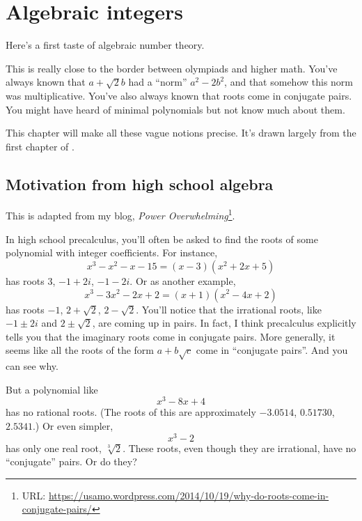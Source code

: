 \chapter{Algebraic integers}
Here's a first taste of algebraic number theory.

This is really close to the border between olympiads and higher math.
You've always known that $a+\sqrt2 b$ had a ``norm'' $a^2-2b^2$,
and that somehow this norm was multiplicative.
You've also always known that roots come in conjugate pairs.
You might have heard of minimal polynomials but not know much about them.

This chapter will make all these vague notions precise.
It's drawn largely from the first chapter of \cite{ref:oggier_NT}.

\section{Motivation from high school algebra}
This is adapted from my blog, \emph{Power Overwhelming}\footnote{URL: \url{https://usamo.wordpress.com/2014/10/19/why-do-roots-come-in-conjugate-pairs/}}.

In high school precalculus, you'll often be asked to find the roots of some polynomial with integer coefficients.
For instance,
\[ x^3 - x^2 - x - 15 = (x-3)(x^2+2x+5) \]
has roots $3$, $-1+2i$, $-1-2i$.
Or as another example, 
\[ x^3 - 3x^2 - 2x + 2 = (x+1)(x^2-4x+2) \]
has roots $-1$, $2 + \sqrt 2$, $2 - \sqrt 2$.
You'll notice that the irrational roots, like $-1 \pm 2i$ and $2 \pm \sqrt 2$, are coming up in pairs. In fact, I think precalculus explicitly tells you that the imaginary roots come in conjugate pairs. More generally, it seems like all the roots of the form $a + b \sqrt c$ come in ``conjugate pairs''. And you can see why.

But a polynomial like
\[ x^3 - 8x + 4 \]
has no rational roots.
(The roots of this are approximately $-3.0514$, $0.51730$, $2.5341$.)
Or even simpler,
\[ x^3 - 2 \]
has only one real root, $\sqrt[3]{2}$.
These roots, even though they are irrational, have no ``conjugate'' pairs.
Or do they?

